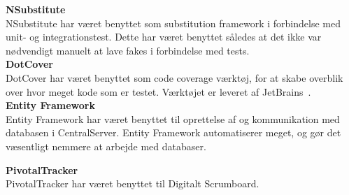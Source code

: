 \textbf{NSubstitute}~\cite{NSubstitute}\\
NSubstitute har været benyttet som substitution framework i forbindelse med unit- og integrationstest. Dette har været benyttet således at det ikke var nødvendigt manuelt at lave fakes i forbindelse med tests.\\

\textbf{DotCover}~\cite{dotCover}\\
DotCover har været benyttet som code coverage værktøj, for at skabe overblik over hvor meget kode som er testet. Værktøjet er leveret af JetBrains~\cite{JetBrains}.\\

\textbf{Entity Framework}~\cite{EF}\\
Entity Framework har været benyttet til oprettelse af og kommunikation med databasen i CentralServer. Entity Framework automatiserer meget, og gør det væsentligt nemmere at arbejde med databaser.

\textbf{PivotalTracker}~\cite{Pivotal}\\
PivotalTracker har været benyttet til Digitalt Scrumboard.
